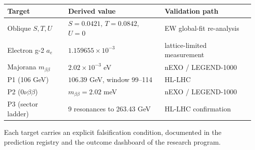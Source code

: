 \begin{center}
\begin{tabular}{lll}
\hline
\textbf{Target} & \textbf{Derived value} & \textbf{Validation path} \\
\hline
Oblique $S,T,U$ & $S=0.0421$, $T=0.0842$, $U=0$ & EW global-fit re-analysis \\
Electron g-2 $a_e$ & $1.159655\times10^{-3}$ & lattice-limited measurement \\
Majorana $m_{\beta\beta}$ & $2.02\times10^{-3}$ eV & nEXO / LEGEND-1000 \\
P1 (106 GeV) & $106.39$ GeV, window 99--114 & HL-LHC \\
P2 ($0\nu\beta\beta$) & $m_{\beta\beta}=2.02$ meV & nEXO / LEGEND-1000 \\
P3 (sector ladder) & 9 resonances to 263.43 GeV & HL-LHC confirmation \\
\hline
\end{tabular}
\end{center}

Each target carries an explicit falsification condition, documented in the prediction
registry and the outcome dashboard of the research program.
